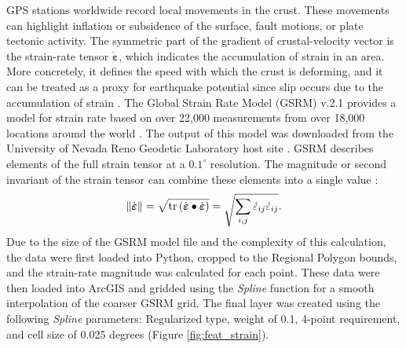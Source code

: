 GPS stations worldwide record local movements in the crust. These movements can highlight inflation or subsidence of the surface, fault motions, or plate tectonic activity. The symmetric part of the gradient of crustal-velocity vector is the strain-rate tensor $\dot{\boldsymbol\varepsilon}$, which indicates the accumulation of strain in an area. More concretely, it defines the speed with which the crust is deforming, and it can be treated as a proxy for earthquake potential since slip occurs due to the accumulation of strain \citep{gem_strain_2014}. The Global Strain Rate Model (GSRM) v.2.1 provides a model for strain rate based on over 22,000 measurements from over 18,000 locations around the world \citep{kreemer_geodetic_2014}. The output of this model was downloaded from the University of Nevada Reno Geodetic Laboratory host site \citep{kreemer_global_2020}. GSRM describes elements of the full strain tensor at a $0.1^\circ$ resolution. The magnitude or second invariant of the strain tensor can combine these elements into a single value \citep{kreemer_geodetic_2014}:
\begin{equation}\label{eq:strainratemagnitude}
\left\lVert\dot{\boldsymbol\varepsilon}\right\rVert = \sqrt{\mathop{\rm tr}\left({\dot{\boldsymbol\varepsilon}}\bullet{\dot{\boldsymbol\varepsilon}}\right)}
=\sqrt{\sum_{i,j}\dot\varepsilon_{ij}\dot\varepsilon_{ij}}.
\end{equation}
Due to the size of the GSRM model file and the complexity of this calculation, the data were first loaded into Python, cropped to the Regional Polygon bounds, and the strain-rate magnitude was calculated for each point. These data were then loaded into ArcGIS and gridded using the \textit{Spline} function for a smooth interpolation of the coarser GSRM grid. The final layer  was created using the following \textit{Spline} parameters: Regularized type, weight of 0.1, 4-point requirement, and cell size of 0.025 degrees (Figure \ref{fig:feat_strain}).

